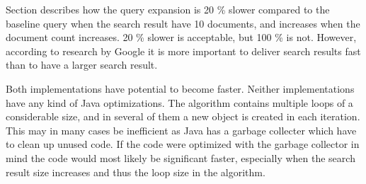 Section describes how the query expansion is 20 \% slower compared to the baseline query when the search result have 10 documents,
and increases when the document count increases.
20 \% slower is acceptable,
but 100 \% is not.
However,
according to research by Google \cite{google-latency} it is more important to deliver search results fast than to have a larger search result.

Both implementations have potential to become faster.
Neither implementations have any kind of Java optimizations.
The algorithm contains multiple loops of a considerable size,
and in several of them a new object is created in each iteration.
This may in many cases be inefficient as Java has a garbage collecter which have to clean up unused code.
If the code were optimized with the garbage collector in mind the code would most likely be significant faster,
especially when the search result size increases and thus the loop size in the algorithm.




